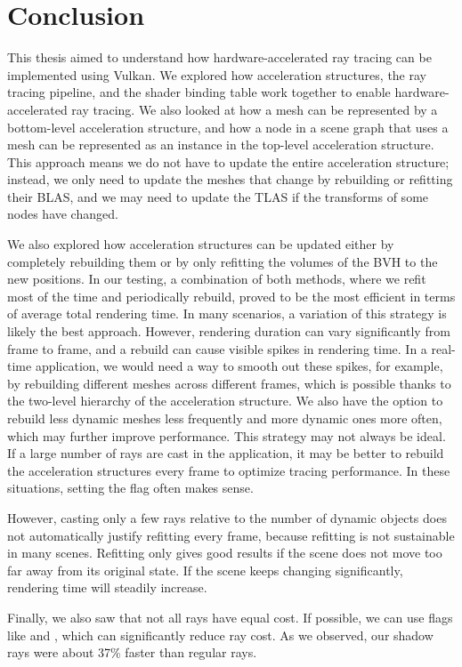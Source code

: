 
\chapter{Conclusion}

This thesis aimed to understand how hardware-accelerated ray tracing can be implemented using Vulkan. We explored how acceleration structures, the ray tracing pipeline, and the shader binding table work together to enable hardware-accelerated ray tracing. We also looked at how a mesh can be represented by a bottom-level acceleration structure, and how a node in a scene graph that uses a mesh can be represented as an instance in the top-level acceleration structure. This approach means we do not have to update the entire acceleration structure; instead, we only need to update the meshes that change by rebuilding or refitting their BLAS, and we may need to update the TLAS if the transforms of some nodes have changed.

We also explored how acceleration structures can be updated either by completely rebuilding them or by only refitting the volumes of the BVH to the new positions. In our testing, a combination of both methods, where we refit most of the time and periodically rebuild, proved to be the most efficient in terms of average total rendering time. In many scenarios, a variation of this strategy is likely the best approach. However, rendering duration can vary significantly from frame to frame, and a rebuild can cause visible spikes in rendering time. In a real-time application, we would need a way to smooth out these spikes, for example, by rebuilding different meshes across different frames, which is possible thanks to the two-level hierarchy of the acceleration structure. We also have the option to rebuild less dynamic meshes less frequently and more dynamic ones more often, which may further improve performance.
This strategy may not always be ideal. If a large number of rays are cast in the application, it may be better to rebuild the acceleration structures every frame to optimize tracing performance. In these situations, setting the  flag often makes sense.

However, casting only a few rays relative to the number of dynamic objects does not automatically justify refitting every frame, because refitting is not sustainable in many scenes. Refitting only gives good results if the scene does not move too far away from its original state. If the scene keeps changing significantly, rendering time will steadily increase.

Finally, we also saw that not all rays have equal cost. If possible, we can use flags like  and , which can significantly reduce ray cost. As we observed, our shadow rays were about 37\% faster than regular rays.